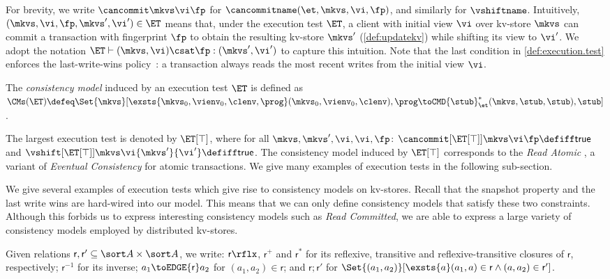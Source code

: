 For brevity, we write \( \cancommit \mkvs  \vi  \fp \) for \( \cancommitname (\et,\mkvs, \vi, \fp) \),
and similarly for \(\vshiftname \).
Intuitively, \((\mkvs, \vi, \fp, \mkvs', \vi') \in \ET\) means that, under the execution test \(\ET\),
a client with initial view \(\vi\) over kv-store \(\mkvs\) can commit a transaction with 
fingerprint \(\fp\) to obtain the resulting kv-store \(\mkvs'\) (\cref{def:updatekv}) while shifting its view
to \(\vi'\). We adopt the notation \(\ET \vdash (\mkvs, \vi) \csat \fp: (\mkvs', \vi')\) to capture this intuition. 
Note that the last condition in \cref{def:execution.test} enforces the last-write-wins
policy~\cite{vogels:2009:ec:1435417.1435432}: 
a transaction always reads the most recent writes from the initial view \(\vi\).  

\SpaceAboveDef
\begin{definition}
\label{def:cm}
The \emph{consistency model} induced by an execution test \(\ET\) is defined as 
\(
\CMs(\ET) \defeq 
\Set{\mkvs}[ 
\exsts{\mkvs_0,\vienv_0,\clenv,\prog}
(\mkvs_0,\vienv_0,\clenv),\prog \toCMD{\stub}_{\et}^{*} (\mkvs, \stub, \stub),\stub
]
\).
\end{definition}
\SpaceBelowDef

The largest execution test is denoted by \(\ET[\top]\), where for all \(\mkvs, \mkvs', \vi, \vi, \fp\):
\( \cancommit[{\ET[\top]}] \mkvs \vi \fp \defiff \mathsf{true} \) and
\( \vshift[{\ET[\top]}] \mkvs \vi {\mkvs'} {\vi'} \defiff \mathsf{true} \).
The consistency model induced by \(\ET[\top]\) 
corresponds to the \emph{Read Atomic} \cite{ramp}, a variant of \emph{Eventual 
Consistency} \cite{ev_transactions} for atomic transactions. 
We give many examples of execution tests in the following sub-section. 


\label{subsec:cm_examples}
We give several examples of execution tests which give rise to consistency
models on kv-stores.
Recall that the snapshot property and the last write wins are hard-wired into our model. 
This means that we can only define  consistency models that satisfy these two constraints. 
Although this forbids us to express interesting consistency models such as \emph{Read Committed}, we are able to express a large variety of consistency models employed by distributed kv-stores.

Given relations \(\mathsf r, \mathsf r' \subseteq \sort A \times \sort A\),
we write:  \(\mathsf r\rflx\), \(\mathsf r^+\) and \(\mathsf r^*\) for its reflexive, transitive and reflexive-transitive closures of \(\mathsf r\), respectively;
\(\mathsf r^{-1}\) for its inverse;
\(a_1 \toEDGE{\mathsf r} a_2\) for \((a_1, a_2) \in \mathsf r\);
and \( \mathsf r; \mathsf r'\) for \( \Set{(a_1,a_2)}[\exsts{a} (a_1,a) \in \mathsf r\land (a,a_2) \in \mathsf r']\).

